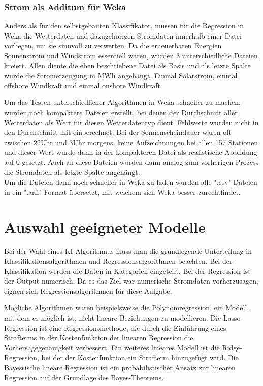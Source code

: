 \documentclass[letterpaper]{article} %
\begin{document}
        \subsubsection*{Strom als Additum für Weka}
            Anders als für den selbstgebauten Klassifikator, müssen für die Regression in Weka die Wetterdaten und dazugehörigen Stromdaten innerhalb einer Datei vorliegen, um sie sinnvoll zu verwerten. Da die erneuerbaren Energien Sonnenstrom und Windstrom essentiell waren, wurden 3 unterschiedliche Dateien kreiert. Allen diente die eben beschriebene Datei als Basis und als letzte Spalte wurde die Stromerzeugung in MWh angehängt. Einmal Solarstrom, einmal offshore Windkraft und einmal onshore Windkraft.

            Um das Testen unterschiedlicher Algorithmen in Weka schneller zu machen, wurden noch kompaktere Dateien erstellt, bei denen der Durchschnitt aller Wetterdaten als Wert für diesen Wetterdatentyp dient. Fehlwerte wurden nicht in den Durchschnitt mit einberechnet. Bei der Sonnenscheindauer waren oft zwischen 22Uhr und 3Uhr morgens, keine Aufzeichnungen bei allen 157 Stationen und dieser Wert wurde dann in der kompakteren Datei als realistische Abbildung auf 0 gesetzt.
            Auch an diese Dateien wurden dann analog zum vorherigen Prozess die Stromdaten als letzte Spalte angehängt.
        \\

        Um die Dateien dann noch schneller in Weka zu laden wurden alle ".csv" Dateien in ein ".arff" Format übersetzt, mit welchem sich Weka besser zurechtfindet.


\section{Auswahl geeigneter Modelle}
    Bei der Wahl eines KI Algorithmus muss man die grundlegende Unterteilung in Klassifikationsalgorithmen und Regressionsalgorithmen beachten. Bei der Klassifikation werden die Daten in Kategorien eingeteilt. Bei der Regression ist der Output numerisch. Da es das Ziel war numerische Stromdaten vorherzusagen, eignen sich Regressionsalgorithmen für diese Aufgabe.
    
    Mögliche Algorithmen wären beispielsweise die Polynomregression, ein Modell, mit dem es möglich ist, nicht lineare Beziehungen zu modellieren. Die Lasso-Regression ist eine Regressionsmethode, die durch die Einführung eines Strafterms in der Kostenfunktion der linearen Regression die Vorhersagegenauigkeit verbessert. Ein weiteres lineares Modell ist die Ridge-Regression, bei der der Kostenfunktion ein Strafterm hinzugefügt wird. Die Bayessische lineare Regression ist ein probabilistischer Ansatz zur linearen Regression auf der Grundlage des Bayes-Theorems.
    
\end{document}
